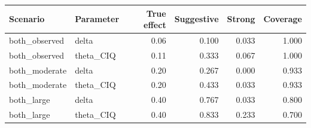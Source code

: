 \begin{tabular}{@{}llrrrr@{}}
\toprule
Scenario & Parameter & True effect & Suggestive & Strong & Coverage \\
\midrule
both\_observed & delta & 0.06 & 0.100 & 0.033 & 1.000 \\
both\_observed & theta\_CIQ & 0.11 & 0.333 & 0.067 & 1.000 \\
both\_moderate & delta & 0.20 & 0.267 & 0.000 & 0.933 \\
both\_moderate & theta\_CIQ & 0.20 & 0.433 & 0.033 & 0.933 \\
both\_large & delta & 0.40 & 0.767 & 0.033 & 0.800 \\
both\_large & theta\_CIQ & 0.40 & 0.833 & 0.233 & 0.700 \\
\bottomrule
\end{tabular}
